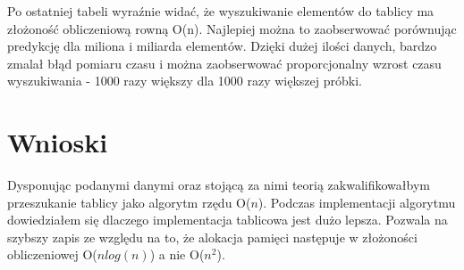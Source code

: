 \documentclass[11pt,a4paper]{article}
\begin{document}
\bigskip

Po ostatniej tabeli wyraźnie widać, że wyszukiwanie elementów do tablicy ma złożoność obliczeniową rowną O(n). Najlepiej można to zaobserwować porównując predykcję dla miliona i miliarda elementów. Dzięki dużej ilości danych, bardzo zmalał błąd pomiaru czasu i można zaobserwować proporcjonalny wzrost czasu wyszukiwania - 1000 razy większy dla 1000 razy większej próbki.

\section{Wnioski}
\hspace{4ex}Dysponując podanymi danymi oraz stojącą za nimi teorią zakwalifikowałbym przeszukanie tablicy jako algorytm rzędu O($n$). Podczas implementacji algorytmu dowiedziałem się dlaczego implementacja tablicowa jest dużo lepsza. Pozwala na szybszy zapis ze względu na to, że alokacja pamięci następuje w złożoności obliczeniowej O($nlog(n)$) a nie O($n^2$).
\end{document}
